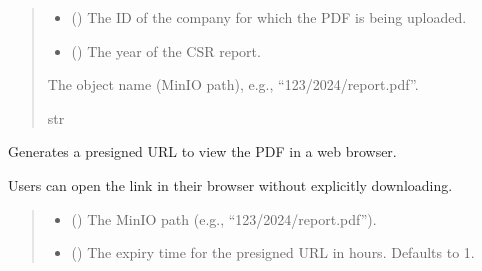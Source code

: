 \documentclass[letterpaper,10pt,english]{sphinxmanual}
\begin{document}
\begin{fulllineitems}
\begin{fulllineitems}
\begin{quote}
\begin{description}
\begin{itemize}
\item {} 
\sphinxAtStartPar
{} () \textendash{} The ID of the company for which the PDF is being uploaded.

\item {} 
\sphinxAtStartPar
{} () \textendash{} The year of the CSR report.

\end{itemize}

\sphinxAtStartPar
The object name (MinIO path), e.g., “123/2024/report.pdf”.

\sphinxAtStartPar
str

\end{description}\end{quote}

\end{fulllineitems}


\begin{fulllineitems}
\label{\detokenize{src.database:src.database.minio.MinioFileSystem.view_pdf}}
\pysigstartsignatures
\pysiglinewithargsret
{}
{\sphinxparamcomma {}}
{}
\pysigstopsignatures
\sphinxAtStartPar
Generates a presigned URL to view the PDF in a web browser.

\sphinxAtStartPar
Users can open the link in their browser without explicitly downloading.
\begin{quote}\begin{description}
\begin{itemize}
\item {} 
\sphinxAtStartPar
{} () \textendash{} The MinIO path (e.g., “123/2024/report.pdf”).

\item {} 
\sphinxAtStartPar
{} (\sphinxstyleliteralemphasis{\sphinxupquote{, }}) \textendash{} The expiry time for the presigned URL in hours. Defaults to 1.


\end{itemize}
\end{description}
\end{quote}
\end{fulllineitems}
\end{fulllineitems}
\end{document}
